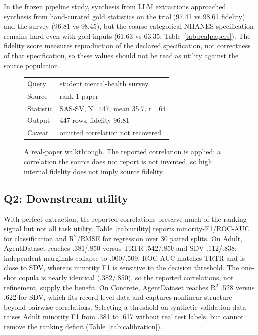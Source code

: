 \documentclass[letterpaper]{article}
\begin{document}
In the frozen pipeline study, synthesis from LLM extractions approached synthesis from
hand-curated gold statistics on the trial
(97.41 vs 98.61 fidelity) and the survey (96.81 vs 98.45), but the coarse categorical NHANES
specification remains hard even with gold inputs (61.63 vs 63.35; Table~\ref{tab:realpapers}).
The fidelity score measures reproduction of the declared specification, not correctness of that
specification, so these values should not be read as utility against the source population.

\begin{figure}[t]
\centering
\small
\begin{tabular}{ll}
\toprule
Query & student mental-health survey \\
Source & rank 1 paper \\
Statistic & SAS-SV, N{=}447, mean 35.7, r{=}.64 \\
Output & 447 rows, fidelity 96.81 \\
Caveat & omitted correlation not recovered \\
\bottomrule
\end{tabular}
\caption{A real-paper walkthrough. The reported correlation is applied; a correlation the source
does not report is not invented, so high internal fidelity does not imply source fidelity.}
\label{fig:walkthrough}
\end{figure}

\subsection{Q2: Downstream utility}
\label{sec:q2}

With perfect extraction, the reported correlations preserve much of the ranking signal but not
all task utility. Table~\ref{tab:utility} reports minority-F1/ROC-AUC for classification and
R$^2$/RMSE for regression over 30 paired splits. On Adult, AgentDataset reaches .381/.850 versus
TRTR .542/.850 and SDV .112/.838; independent marginals collapse to .000/.509. ROC-AUC matches
TRTR and is close to SDV, whereas minority F1 is sensitive to the decision threshold. The one-shot
copula is nearly identical (.382/.850), so the reported correlations, not refinement, supply the
benefit. On Concrete, AgentDataset reaches R$^2$ .528 versus .622 for SDV, which fits record-level
data and captures nonlinear structure beyond pairwise correlations. Selecting a threshold on
synthetic validation data raises Adult minority F1 from .381 to .617 without real test labels, but
cannot remove the ranking deficit (Table~\ref{tab:calibration}).
\end{document}
